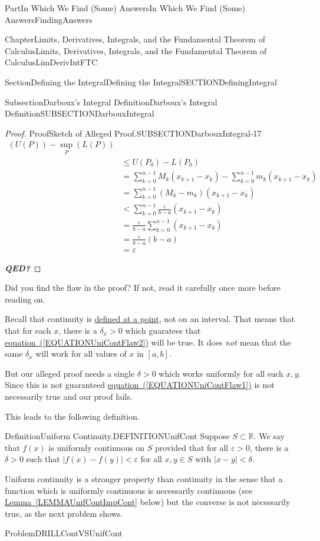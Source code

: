 \documentclass[oneside,10pt,]{book}
\newcommand{\xreffont}{\relax}
\newcommand{\alert}[1]{\textbf{\textit{#1}}}
\numberwithin{equation}{part}
\newcommand{\eps}{\varepsilon}
\newcommand{\RR}{\mathbb {R}}
\newcommand{\lt}{<}
\newcommand{\amp}{&}
\begin{document}
\begin{partptx}{Part}{In Which We Find (Some) Answers}{}{In Which We Find (Some) Answers}{}{}{FindingAnswers}
\begin{chapterptx}{Chapter}{Limits, Derivatives, Integrals, and the Fundamental Theorem of Calculus}{}{Limits, Derivatives, Integrals, and the Fundamental Theorem of Calculus}{}{}{LimDerivIntFTC}
\begin{sectionptx}{Section}{Defining the Integral}{}{Defining the Integral}{}{}{SECTIONDefiningIntegral}
\begin{subsectionptx}{Subsection}{Darboux's Integral Definition}{}{Darboux's Integral Definition}{}{}{SUBSECTIONDarbouxIntegral}
\begin{proof}{Proof}{Sketch of Alleged Proof.}{SUBSECTIONDarbouxIntegral-17}
\begin{align*}
\left(U(P)\right) -\sup_{P} \left(L(P)\right)\\
\amp{}     \le U\left(P_0\right)-L(P_0)\\
\amp{}      =\sum^{n-1}_{k=0}{M_k\left(x_{k+1}-x_k\right)}-\sum^{n-1}_{k=0}{m_k\left(x_{k+1}-x_k\right)}\\
\amp{}      =\sum^{n-1}_{k=0}{\left(M_k-m_k\right)\left(x_{k+1}-x_k\right)}\\
\amp{}        \lt \sum^{n-1}_{k=0}{\frac{\eps
}{b-a}\left(x_{k+1}-x_k\right)}\\
\amp{}        =\frac{\eps
}{b-a}\sum^{n-1}_{k=0}{\left(x_{k+1}-x_k\right)}\\
\amp{}=\frac{\eps }{b-a}\left(b-a\right)\\
\amp{}=\eps
\end{align*}
%
\par
\alert{QED?}%
\end{proof}
Did you find the flaw in the proof? If not, read it carefully once more before reading on.%
\par
Recall that continuity is \hyperref[def_continuity]{defined at a point}, not on an interval. That means that that for each \(x\), there is a \({\delta }_x>0\) which guaratees that \hyperref[EQUATIONUniContFlaw2]{equation~({\xreffont\ref{EQUATIONUniContFlaw2}})} will be true. It does \emph{not} mean that the same \(\delta_x\) will work for all values of \(x\) in \([a,b]\).%
\par
But our alleged proof needs a single \(\delta >0\) which works uniformly for all such \(x, y\). Since this is not guaranteed  \hyperref[EQUATIONUniContFlaw1]{equation~({\xreffont\ref{EQUATIONUniContFlaw1}})} is not necessarily true and our proof fails.%
\par
This leads to the following definition.%
\begin{definition}{Definition}{Uniform Continuity.}{DEFINITIONUnifCont}%
Suppose \(S\subset \RR\).  We say that \(f(x)\) is uniformly continuous on \(S\) provided that for all \(\eps
>0\), there is a \(\delta >0\) such that \(\left|f\left(x\right)-f\left(y\right)\right|\lt \eps \) for all \(x, y\in S\) with \(\left|x-y\right|\lt \delta \).%
\end{definition}
Uniform continuity is a stronger property than continuity in the sense that a function which is uniformly continuous is necessarily continuous (see \hyperref[LEMMAUnifContImpCont]{Lemma~{\xreffont\ref{LEMMAUnifContImpCont}}} below) but the converse is not necessarily true, as the next problem shows.%
\begin{problem}{Problem}{}{DRILLContVSUnifCont}%

\end{problem}
\end{subsectionptx}
\end{sectionptx}
\end{chapterptx}
\end{partptx}
\end{document}
